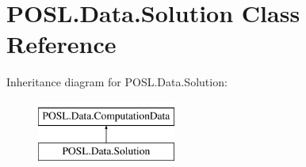 \hypertarget{classPOSL_1_1Data_1_1Solution}{}\section{P\+O\+S\+L.\+Data.\+Solution Class Reference}
\label{classPOSL_1_1Data_1_1Solution}
Inheritance diagram for P\+O\+S\+L.\+Data.\+Solution\+:\begin{figure}[H]
\begin{center}
\leavevmode
\includegraphics[height=2.000000cm]{classPOSL_1_1Data_1_1Solution}
\end{center}
\end{figure}
